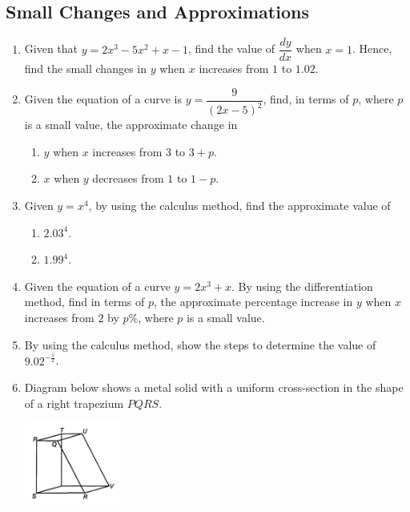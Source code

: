 \documentclass{report}
\begin{document}
\begin{multicols}{2}
      \subsection{Small Changes and Approximations}
      \begin{enumerate}
            \item Given that $y = 2x^3 - 5x^2 + x - 1$, find the value of $\dfrac{dy}{dx}$ when
                  $x = 1$. Hence, find the small changes in $y$ when $x$ increases from $1$ to
                  $1.02$.
            \item Given the equation of a curve is $y = \dfrac{9}{{(2x - 5)}^2}$, find, in terms
                  of $p$, where $p$ is a small value, the approximate change in
                  \begin{enumerate}
                        \item $y$ when $x$ increases from $3$ to $3 + p$.
                        \item $x$ when $y$ decreases from $1$ to $1 - p$.
                  \end{enumerate}
            \item Given $y = x^4$, by using the calculus method, find the approximate value of
                  \begin{enumerate}
                        \item $2.03^4$.
                        \item $1.99^4$.
                  \end{enumerate}
            \item Given the equation of a curve $y = 2x^3 + x$. By using the differentiation
                  method, find in terms of $p$, the approximate percentage increase in $y$ when
                  $x$ increases from $2$ by $p\%$, where $p$ is a small value.
            \item By using the calculus method, show the steps to determine the value of
                  $9.02^{-\frac{1}{2}}$.
            \item Diagram below shows a metal solid with a uniform cross-section in the shape of
                  a right trapezium $PQRS$.
                  \begin{center}
                        \includegraphics[width=0.25\textwidth]{./images/k2q5.jpeg}

\end{center}
\end{enumerate}
\end{multicols}
\end{document}
